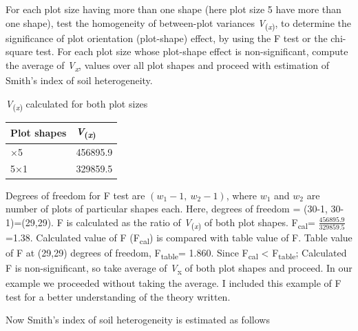 \documentclass[
]{book}
\begin{document}
For each plot size having more than one shape (here plot size 5 have
more than one shape), test the homogeneity of between-plot variances
\emph{V}\textsubscript{(\emph{x})}, to determine the significance of plot orientation
(plot-shape) effect, by using the F test or the chi-square test. For
each plot size whose plot-shape effect is non-significant, compute the
average of \emph{V\textsubscript{x}}, values over all plot shapes and proceed with
estimation of Smith's index of soil heterogeneity.

\emph{V}\textsubscript{(\emph{x})} calculated for both plot sizes

\begin{longtable}[]{@{}ll@{}}
\toprule\noalign{}
Plot shapes & \emph{V}\textsubscript{(\emph{x})} \\
\midrule\noalign{}
\endhead
\bottomrule\noalign{}
\endlastfoot
1×5 & 456895.9 \\
5×1 & 329859.5 \\
\end{longtable}

Degrees of freedom for F test are \((w_{1} - 1,\ w_{2} - 1)\), where
\(w_{1}\) and \(w_{2}\) are number of plots of particular shapes each. Here,
degrees of freedom = (30-1, 30-1)=(29,29). F is calculated as the ratio
of \emph{V}\textsubscript{(\emph{x})} of both plot shapes. F\textsubscript{cal}= \(\frac{456895.9}{329859.5}\)
=1.38. Calculated value of F (F\textsubscript{cal}) is compared with table value of F.
Table value of F at (29,29) degrees of freedom, F\textsubscript{table}= 1.860. Since
F\textsubscript{cal} \textless{} F\textsubscript{table}; Calculated F is non-significant, so take average of
\emph{V}\textsubscript{x} of both plot shapes and proceed. In our example we proceeded
without taking the average. I included this example of F test for a
better understanding of the theory written.

Now Smith's index of soil heterogeneity is estimated as follows
\end{document}
